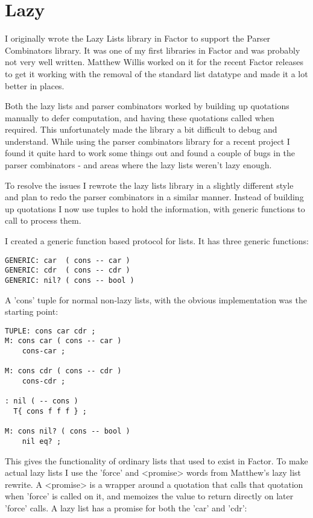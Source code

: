 \chapter{Lazy}\label{lazy}

I originally wrote the Lazy Lists library in Factor to support the
Parser Combinators library. It was one of my first libraries in Factor
and was probably not very well written. Matthew Willis worked on it
for the recent Factor releases to get it working with the removal of
the standard list datatype and made it a lot better in places.

Both the lazy lists and parser combinators worked by building up
quotations manually to defer computation, and having these quotations
called when required. This unfortunately made the library a bit
difficult to debug and understand. While using the parser combinators
library for a recent project I found it quite hard to work some things
out and found a couple of bugs in the parser combinators - and areas
where the lazy lists weren't lazy enough.

To resolve the issues I rewrote the lazy lists library in a slightly
different style and plan to redo the parser combinators in a similar
manner. Instead of building up quotations I now use tuples to hold the
information, with generic functions to call to process them.

I created a generic function based protocol for lists. It has three
generic functions:

\begin{verbatim}
GENERIC: car  ( cons -- car )
GENERIC: cdr  ( cons -- cdr )
GENERIC: nil? ( cons -- bool )
\end{verbatim}


A 'cons' tuple for normal non-lazy lists, with the obvious
implementation was the starting point:

\begin{verbatim}
TUPLE: cons car cdr ;
M: cons car ( cons -- car )
    cons-car ;    

M: cons cdr ( cons -- cdr )
    cons-cdr ;    

: nil ( -- cons )
  T{ cons f f f } ;

M: cons nil? ( cons -- bool )
    nil eq? ;
\end{verbatim}


This gives the functionality of ordinary lists that used to exist in Factor. To make actual lazy lists I use the 'force' and <promise> words from Matthew's lazy list rewrite. A <promise> is a wrapper around a quotation that calls that quotation when 'force' is called on it, and memoizes the value to return directly on later 'force' calls. A lazy list has a promise for both the 'car' and 'cdr':

